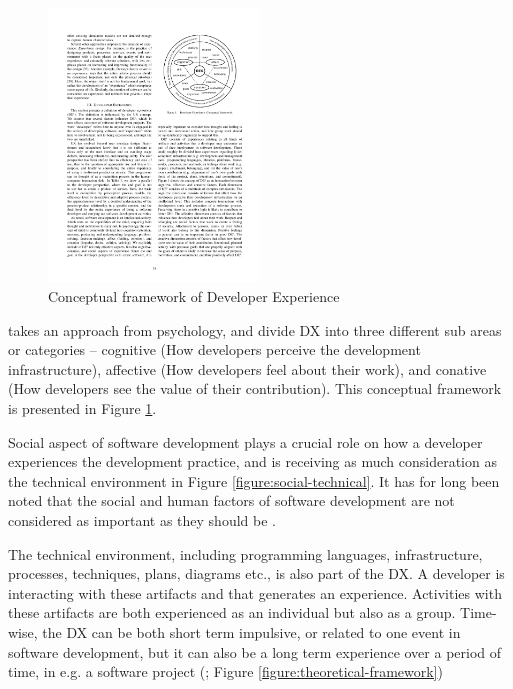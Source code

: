 \documentclass[english, 12pt, a4paper, sci, utf8, a-1b, online]{aaltothesis}
\begin{document}
\begin{figure}[H]
  \begin{center}
    \includegraphics[width=0.5\textwidth]{dx-conceptual.pdf}
  \end{center}
  \captionsetup{width=0.5\textwidth}
  \caption{Conceptual framework of Developer Experience \parencite{fagerholm-dx-concept-and-definition}}
  \label{figure:conceptual-framework}
\end{figure}

\textcite{fagerholm-dx-concept-and-definition} takes an approach from psychology, and divide DX into three different sub areas or categories – cognitive (How developers perceive the development infrastructure), affective (How developers feel about their work), and conative (How developers see the value of their contribution). This conceptual framework is presented in Figure \ref{figure:conceptual-framework}.

Social aspect of software development plays a crucial role on how a developer experiences the development practice, and is receiving as much consideration as the technical environment in Figure \ref{figure:social-technical}. It has for long been noted that the social and human factors of software development are not considered as important as they should be \parencite{human-factor}.

The technical environment, including programming languages, infrastructure, processes, techniques, plans, diagrams etc., is also part of the DX. A developer is interacting with these artifacts and that generates an experience. Activities with these artifacts are both experienced as an individual but also as a group. Time-wise, the DX can be both short term impulsive, or related to one event in software development, but it can also be a long term experience over a period of time, in e.g. a software project (\cite{fagerholm-doctoral-thesis}; Figure \ref{figure:theoretical-framework})
\end{document}

